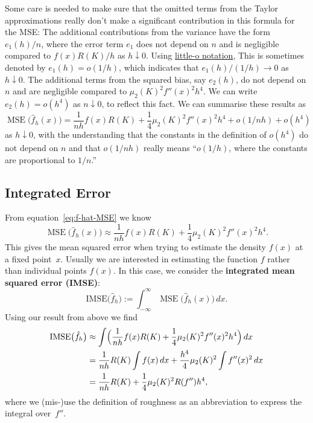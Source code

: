 \documentclass[
  a4paper,
]{article}
\theoremstyle{definition}
\theoremstyle{definition}
\theoremstyle{definition}
\theoremstyle{definition}
\theoremstyle{remark}
\begin{document}
Some care is needed to make sure that the omitted terms from the Taylor
approximations really don't make a significant contribution in this formula for
the MSE: The additional contributions from the variance have the form \(e_1(h)
/ n\), where the error term \(e_1\) does not depend on \(n\) and is negligible
compared to \(f(x) R(K) / h\) as \(h \downarrow 0\). Using
\href{https://en.wikipedia.org/wiki/Big_O_notation\#Little-o_notation}{little-o notation},
This is sometimes denoted by \(e_1(h) = o(1/h)\), which indicates that \(e_1(h) /
(1/h) \to 0\) as \(h \downarrow 0\). The additional terms from the squared bias, say
\(e_2(h)\), do not depend on \(n\) and are negligible compared to \(\mu_2(K)^2
f''(x)^2 h^4\). We can write \(e_2(h) = o(h^4)\) as \(n \downarrow 0\), to reflect
this fact. We can summarise these results as
\begin{equation*}
  \mathop{\mathrm{MSE}}\nolimits\bigl( \hat f_h(x) \bigr)
  = \frac{1}{nh} f(x) R(K)
      + \frac14 \mu_2(K)^2 f''(x)^2 h^4
      + o(1/nh) + o(h^4)
\end{equation*}
as \(h \downarrow 0\),
with the understanding that the constants in the definition of \(o(h^4)\)
do not depend on \(n\) and that \(o(1/nh)\) really means ``\(o(1/h)\), where the
constants are proportional to \(1/n\).''

\subsection{Integrated Error}\label{IMSE}

From equation~\eqref{eq:f-hat-MSE} we know
\begin{equation*}
  \mathop{\mathrm{MSE}}\nolimits\bigl( \hat f_h(x) \bigr)
  \approx \frac{1}{nh} f(x) R(K) + \frac14 \mu_2(K)^2 f''(x)^2 h^4.
\end{equation*}
This gives the mean squared error when trying to estimate the density
\(f(x)\) at a fixed point~\(x\). Usually we are interested in estimating
the function \(f\) rather than individual points \(f(x)\). In this case,
we consider the \textbf{integrated mean squared error (IMSE)}:
\begin{equation*}
  \mathrm{IMSE}\bigl( \hat f_h \bigr)
  := \int_{-\infty}^\infty \mathop{\mathrm{MSE}}\nolimits\bigl( \hat f_h(x) \bigr) \,dx.
\end{equation*}
Using our result from above we find
\begin{align*}
  \mathrm{IMSE}\bigl( \hat f_h \bigr)
  &\approx \int \Bigl( \frac{1}{nh} f(x) R(K) + \frac14 \mu_2(K)^2 f''(x)^2 h^4 \Bigr) \,dx \\
  &= \frac{1}{nh} R(K) \int f(x) \,dx + \frac{h^4}{4} \mu_2(K)^2 \int f''(x)^2 \,dx \\
  &= \frac{1}{nh} R(K) + \frac{1}{4} \mu_2(K)^2 R(f'') h^4,
\end{align*}
where we (mis-)use the definition of roughness as an abbreviation to express
the integral over~\(f''\).
\end{document}
